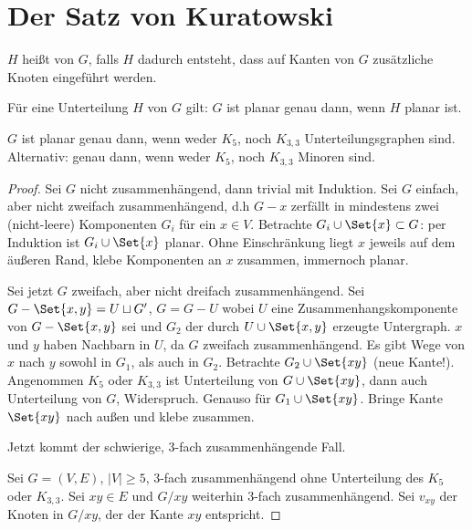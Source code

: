 \chapter{Der Satz von Kuratowski}


\begin{df}
    $H$ heißt  von $G$, falls $H$ dadurch entsteht, dass auf Kanten von $G$ zusätzliche Knoten eingeführt werden.
\end{df}

\begin{note}
    Für eine Unterteilung $H$ von $G$ gilt:
    $G$ ist planar genau dann, wenn $H$ planar ist.
\end{note}

\begin{st}[Kuratowski, 1930]
    $G$ ist planar genau dann, wenn weder $K_5$, noch $K_{3,3}$ Unterteilungsgraphen sind.
    Alternativ: genau dann, wenn weder $K_5$, noch $K_{3,3}$ Minoren sind.
    \begin{proof}
        Sei $G$ nicht zusammenhängend, dann trivial mit Induktion.
        Sei $G$ einfach, aber nicht zweifach zusammenhängend, d.h $G - x$ zerfällt in mindestens zwei (nicht-leere) Komponenten $G_i$ für ein $x \in V$.
        Betrachte $G_i \cup \Set{x} \subset G$: per Induktion ist $G_i \cup \Set{x}$ planar.
        Ohne Einschränkung liegt $x$ jeweils auf dem äußeren Rand, klebe Komponenten an $x$ zusammen, immernoch planar.

        Sei jetzt $G$ zweifach, aber nicht dreifach zusammenhängend.
        Sei $G - \Set{x,y} = U \sqcup G'$, $G = G - U$ wobei $U$ eine Zusammenhangskomponente von $G - \Set{x,y}$ sei und $G_2$ der durch $U \cup \Set{x,y}$ erzeugte Untergraph.
        $x$ und $y$ haben Nachbarn in $U$, da $G$ zweifach zusammenhängend.
        Es gibt Wege von $x$ nach $y$ sowohl in $G_1$, als auch in $G_2$.
        Betrachte $G_2 \cup \Set{xy}$ (neue Kante!).
        Angenommen $K_5$ oder $K_{3,3}$ ist Unterteilung von $G \cup \Set{xy}$, dann auch Unterteilung von $G$, Widerspruch.
        Genauso für $G_1 \cup \Set{xy}$.
        Bringe Kante $\Set{xy}$ nach außen und klebe zusammen.

        Jetzt kommt der schwierige, 3-fach zusammenhängende Fall.

        Sei $G = (V, E)$, $|V| \ge 5$, 3-fach zusammenhängend ohne Unterteilung des $K_5$ oder $K_{3,3}$.
        Sei $xy \in E$ und $G / xy$ weiterhin 3-fach zusammenhängend.
        Sei $v_{xy}$ der Knoten in $G / xy$, der der Kante $xy$ entspricht.


\end{proof}
\end{st}
